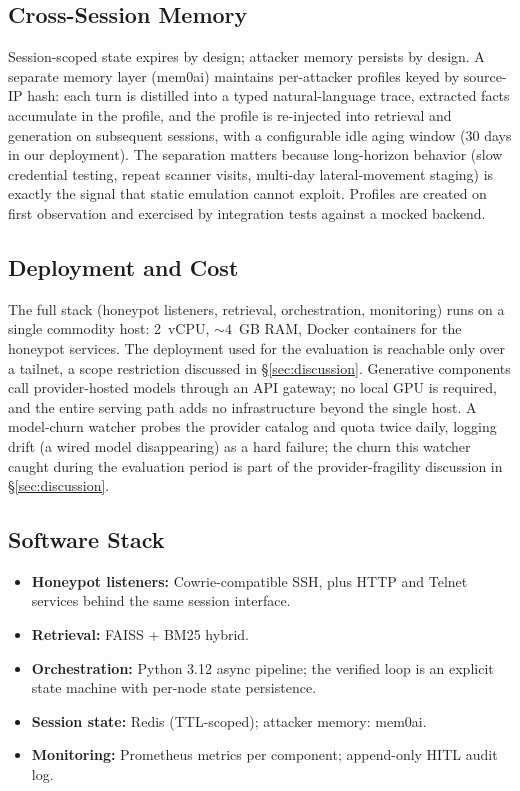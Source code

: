 \subsection{Cross-Session Memory}
Session-scoped state expires by design; attacker memory persists by
design. A separate memory layer (mem0ai) maintains per-attacker
profiles keyed by source-IP hash: each turn is distilled into a typed
natural-language trace, extracted facts accumulate in the profile, and
the profile is re-injected into retrieval and generation on subsequent
sessions, with a configurable idle aging window (30 days in our
deployment). The separation matters because long-horizon behavior
(slow credential testing, repeat scanner visits, multi-day
lateral-movement staging) is exactly the signal that static emulation
cannot exploit. Profiles are created on first observation and exercised
by integration tests against a mocked backend.

\subsection{Deployment and Cost}
The full stack (honeypot listeners, retrieval, orchestration, monitoring)
runs on a single commodity host: 2~vCPU, ${\sim}4$~GB RAM, Docker
containers for the honeypot services. The deployment used for the
evaluation is reachable only over a tailnet, a scope restriction
discussed in \S\ref{sec:discussion}. Generative components
call provider-hosted models through an API gateway; no local GPU is
required, and the entire serving path adds no infrastructure beyond the
single host. A model-churn watcher probes the provider catalog and quota
twice daily, logging drift (a wired model disappearing) as a hard failure;
the churn this watcher caught during the evaluation period is part of the
provider-fragility discussion in \S\ref{sec:discussion}.

\subsection{Software Stack}
\begin{itemize}
\item \textbf{Honeypot listeners:} Cowrie-compatible SSH, plus HTTP and
Telnet services behind the same session interface.
\item \textbf{Retrieval:} FAISS + BM25 hybrid.
\item \textbf{Orchestration:} Python 3.12 async pipeline; the verified
loop is an explicit state machine with per-node state persistence.
\item \textbf{Session state:} Redis (TTL-scoped); attacker memory: mem0ai.
\item \textbf{Monitoring:} Prometheus metrics per component; append-only
HITL audit log.
\end{itemize}
